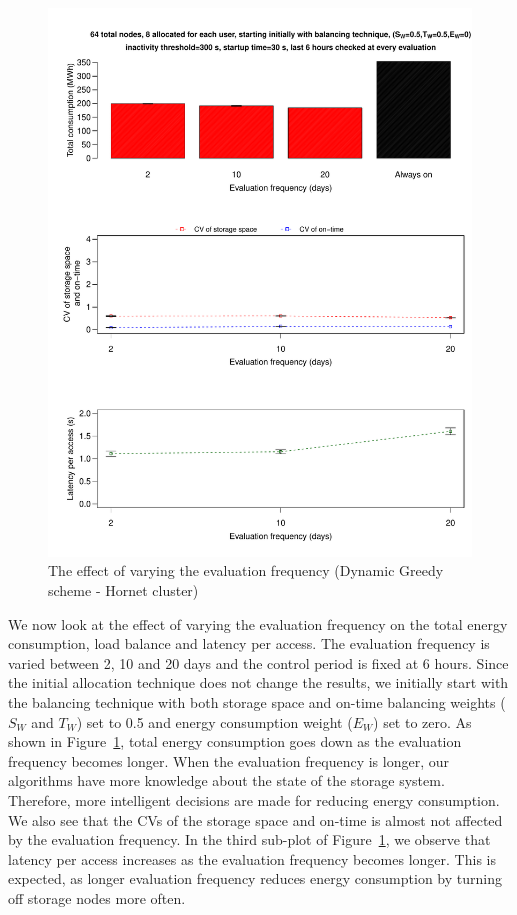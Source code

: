\documentclass[preprint,12pt]{elsarticle}
\begin{document}
\begin{figure}[!htbp]
\centering
\includegraphics[width=\columnwidth,keepaspectratio]{FIG10.pdf}
\caption{The effect of varying the evaluation frequency (Dynamic Greedy scheme - Hornet cluster)}
\label{fifthresult}
\end{figure}

We now look at the effect of varying the evaluation frequency on the total energy consumption,
load balance and latency per access. The evaluation frequency is varied between 2, 10 and 20 days
and the control period is fixed at 6 hours. Since the initial allocation technique does not change
the results, we initially start with the balancing technique with both storage space and on-time
balancing weights ($S_W$ and $T_W$) set to 0.5 and energy consumption weight ($E_W$) set to zero.
As shown in Figure~\ref{fifthresult}, total energy consumption goes down as the evaluation frequency
becomes longer. When the evaluation frequency is longer, our algorithms have more knowledge about
the state of the storage system. Therefore, more intelligent decisions are made for reducing energy
consumption. We also see that the CVs of the storage space and on-time is almost not affected by
the evaluation frequency. In the third sub-plot of Figure~\ref{fifthresult}, we observe that latency
per access increases as the evaluation frequency becomes longer. This is expected, as longer evaluation
frequency reduces energy consumption by turning off storage nodes more often. 
\end{document}
